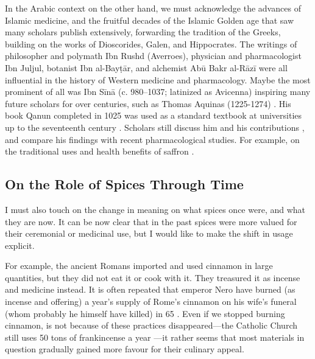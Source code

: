 In the Arabic context on the other hand, we must acknowledge the advances of Islamic medicine, and the fruitful decades of the Islamic Golden age that saw many scholars publish extensively, forwarding the tradition of the Greeks, building on the works of Dioscorides, Galen, and Hippocrates. The writings of philosopher and polymath Ibn Rushd (Averroes), physician and pharmacologist Ibn Juljul, botanist Ibn al-Bayṭār, and alchemist Abū Bakr al-Rāzī were all influential in the history of Western medicine and pharmacology. Maybe the most prominent of all was Ibn Sīnā (c. 980--1037; latinized as Avicenna) inspiring many future scholars for over centuries, such as Thomas Aquinas (1225-1274) \autocite{smith_avicenna_1980}. His book \gls{Qanun} completed in 1025 was used as a standard textbook at universities up to the seventeenth century \autocite{musallam_avicenna_1987}. Scholars still discuss him and his contributions \autocite{sajadi_ibn_2009}, and compare his findings with recent pharmacological studies. For example, on the traditional uses and health benefits of saffron \autocite[see][]{hosseinzadeh_avicennas_2013}.

\subsection{On the Role of Spices Through Time}
\label{shift}

I must also touch on the change in meaning on what spices once were, and what they are now. It can be now clear that in the past spices were more valued for their ceremonial or medicinal use, but I would like to make the shift in usage explicit. 

For example, the ancient Romans imported and used cinnamon in large quantities, but they did not eat it or cook with it. They treasured it as incense and medicine instead. It is often repeated that emperor Nero have burned (as incense and offering) a year's supply of Rome's cinnamon on his wife's funeral (whom probably he himself have killed) in 65 \AD{} \autocite[437-438]{toussaint-samat_history_2009}. Even if we stopped burning cinnamon, is not because of these practices disappeared---the Catholic Church still uses 50 tons of frankincense a year \autocite{ash_why_2020}---it rather seems that most materials in question gradually gained more favour for their culinary appeal. 

